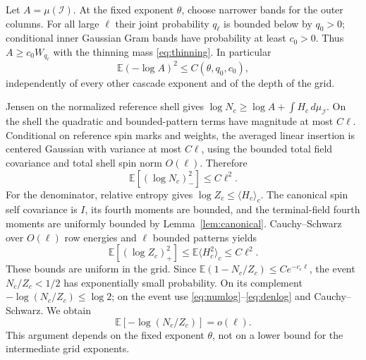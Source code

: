 \documentclass[11pt]{article}
\numberwithin{equation}{section}
\theoremstyle{definition}
\newcommand{\E}{\mathbb E}
\begin{document}
Let $A=\mu(\mathcal I)$. At the fixed exponent $\theta$, choose narrower bands for the outer columns. For all large $\ell$ their joint probability $q_\ell$ is bounded below by $q_0>0$; conditional inner Gaussian Gram bands have probability at least $c_0>0$. Thus $A\ge c_0W_{q_\ell}$ with the thinning mass \eqref{eq:thinning}. In particular
\begin{equation}\label{eq:refshelllog}
\E(-\log A)^2\le C(\theta,q_0,c_0),
\end{equation}
independently of every other cascade exponent and of the depth of the grid.

Jensen on the normalized reference shell gives
$\log N_c\ge\log A+\int H_c\,d\mu_{\mathcal I}$.
On the shell the quadratic and bounded-pattern terms have magnitude at most $C\ell$. Conditional on reference spin marks and weights, the averaged linear insertion is centered Gaussian with variance at most $C\ell$, using the bounded total field covariance and total shell spin norm $O(\ell)$. Therefore
\begin{equation}\label{eq:numlog}
\E[(\log N_c)_-^2]\le C\ell^2.
\end{equation}
For the denominator, relative entropy gives $\log Z_c\le\langle H_c\rangle_c$. The canonical spin self covariance is $I$, its fourth moments are bounded, and the terminal-field fourth moments are uniformly bounded by Lemma~\ref{lem:canonical}. Cauchy--Schwarz over $O(\ell)$ row energies and $\ell$ bounded patterns yields
\begin{equation}\label{eq:denlog}
\E[(\log Z_c)_+^2]\le\E\langle H_c^2\rangle_c\le C\ell^2.
\end{equation}
These bounds are uniform in the grid. Since $\E(1-N_c/Z_c)\le Ce^{-c_\epsilon\ell}$, the event $N_c/Z_c<1/2$ has exponentially small probability. On its complement $-\log(N_c/Z_c)\le\log2$; on the event use \eqref{eq:numlog}--\eqref{eq:denlog} and Cauchy--Schwarz. We obtain
\begin{equation}\label{eq:logshellcost}
\E[-\log(N_c/Z_c)]=o(\ell).
\end{equation}
This argument depends on the fixed exponent $\theta$, not on a lower bound for the intermediate grid exponents.
\end{document}

